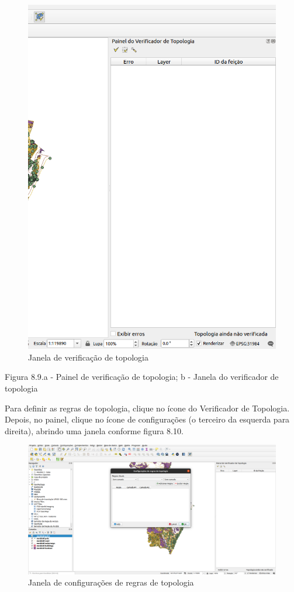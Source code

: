 \documentclass[
]{krantz}
\begin{document}
\begin{figure}
\centering
\includegraphics{media/modulo8/fig89_b.png}
\caption{Janela de verificação de topologia}
\end{figure}

Figura 8.9.a - Painel de verificação de topologia; b - Janela do verificador de topologia

Para definir as regras de topologia, clique no ícone do Verificador de Topologia. Depois, no painel, clique no ícone de configurações (o terceiro da esquerda para direita), abrindo uma janela conforme figura 8.10.

\begin{figure}
\centering
\includegraphics{media/modulo8/fig810.png}
\caption{Janela de configurações de regras de topologia}
\end{figure}
\end{document}
